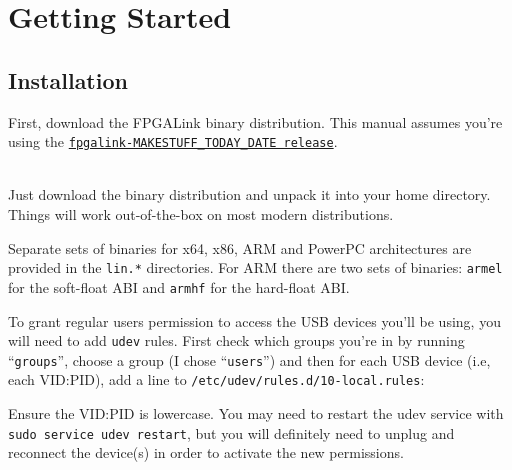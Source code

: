 \newpage
\section{Getting Started}

\subsection{Installation}
First, download the FPGALink binary distribution. This manual assumes you're using the \texttt{\href{http://www.swaton.ukfsn.org/bin/fpgalink-MAKESTUFF_TODAY_DATE/fpgalink-bin.tar.gz}{fpgalink-MAKESTUFF_TODAY_DATE release}}.

\begin{desc}
  \item[\sffamily{Linux:}] \hfill \\
    Just download the binary distribution and unpack it into your home directory. Things will work out-of-the-box on most modern distributions.

    Separate sets of binaries for x64, x86, ARM and PowerPC architectures are provided in the \texttt{lin.*} directories. For ARM there are two sets of binaries: \texttt{armel} for the soft-float ABI and \texttt{armhf} for the hard-float ABI.

    To grant regular users permission to access the USB devices you'll be using, you will need to add \texttt{udev} rules. First check which groups you're in by running ``\texttt{groups}'', choose a group (I chose ``\texttt{users}'') and then for each USB device (i.e, each VID:PID), add a line to \texttt{/etc/udev/rules.d/10-local.rules}:


    Ensure the VID:PID is lowercase. You may need to restart the udev service with \texttt{sudo service udev restart}, but you will definitely need to unplug and reconnect the device(s) in order to activate the new permissions.


\end{desc}
